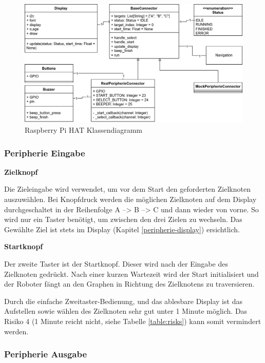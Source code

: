 \begin{figure}[H]
    \centering
    \includegraphics[width=\linewidth]{assets/IT/robot-sw-architecture-peripherie.png}
    \caption{Raspberry Pi HAT Klassendiagramm}
    \label{fig:peripherie-classdiagramm}
\end{figure}

\subsubsection{Peripherie Eingabe}
\label{zieleingabe}

\textbf{Zielknopf}

Die Zieleingabe wird verwendet, um vor dem Start den geforderten Zielknoten auszuwählen. Bei Knopfdruck werden die möglichen Zielknoten auf dem Display durchgeschaltet in der Reihenfolge A --> B --> C und dann wieder von vorne. So wird nur ein Taster benötigt, um zwischen den drei Zielen zu wechseln. Das Gewählte Ziel ist stets im Display (Kapitel \ref{peripherie-display}) ersichtlich.

\textbf{Startknopf}

Der zweite Taster ist der Startknopf. Dieser wird nach der Eingabe des Zielknoten gedrückt. Nach einer kurzen Wartezeit wird der Start initialisiert und der Roboter fängt an den Graphen in Richtung des Zielknotens zu traversieren.

Durch die einfache Zweitaster-Bedienung, und das ablesbare Display ist das Aufstellen sowie wählen des Zielknoten sehr gut unter 1 Minute möglich. Das Risiko 4 (1 Minute reicht nicht, siehe Tabelle \ref{table:risks}) kann somit vermindert werden.

\subsubsection{Peripherie Ausgabe}

